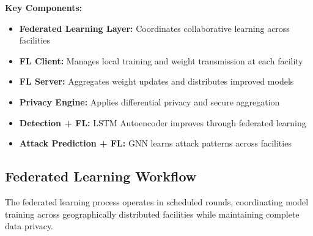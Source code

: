 \documentclass[12pt,a4paper]{article}
\begin{document}
\textbf{Key Components:}
\begin{itemize}[leftmargin=1cm,itemsep=0pt]
    \item \textbf{Federated Learning Layer:} Coordinates collaborative learning across facilities
    \item \textbf{FL Client:} Manages local training and weight transmission at each facility
    \item \textbf{FL Server:} Aggregates weight updates and distributes improved models
    \item \textbf{Privacy Engine:} Applies differential privacy and secure aggregation
    \item \textbf{Detection + FL:} LSTM Autoencoder improves through federated learning
    \item \textbf{Attack Prediction + FL:} GNN learns attack patterns across facilities
\end{itemize}

\subsection{Federated Learning Workflow}

The federated learning process operates in scheduled rounds, coordinating model training across geographically distributed facilities while maintaining complete data privacy.
\end{document}
